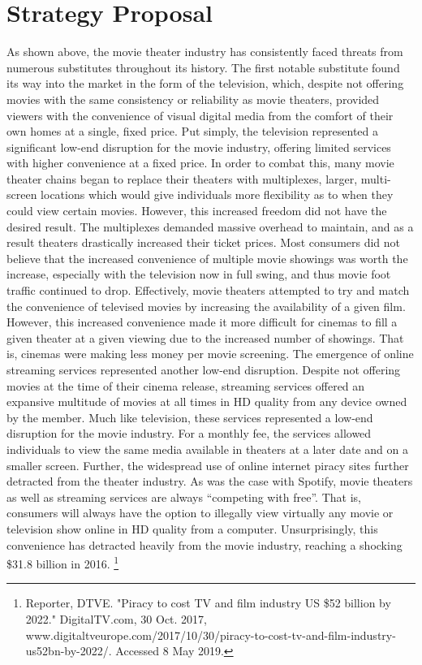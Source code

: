 \documentclass[12pt]{article}
\begin{document}
\section{Strategy Proposal}

As shown above, the movie theater industry has consistently faced threats from numerous substitutes throughout its history. The first notable substitute found its way into the market in the form of the television, which, despite not offering movies with the same consistency or reliability as movie theaters, provided viewers with the convenience of visual digital media from the comfort of their own homes at a single, fixed price. Put simply, the television represented a significant low-end disruption for the movie industry, offering limited services with higher convenience at a fixed price. In order to combat this, many movie theater chains began to replace their theaters with multiplexes, larger, multi-screen locations which would give individuals more flexibility as to when they could view certain movies. However, this increased freedom did not have the desired result. The multiplexes demanded massive overhead to maintain, and as a result theaters drastically increased their ticket prices. Most consumers did not believe that the increased convenience of multiple movie showings was worth the increase, especially with the television now in full swing, and thus movie foot traffic continued to drop. Effectively, movie theaters attempted to try and match the convenience of televised movies by increasing the availability of a given film. However, this increased convenience made it more difficult for cinemas to fill a given theater at a given viewing due to the increased number of showings. That is, cinemas were making less money per movie screening. 
The emergence of online streaming services represented another low-end disruption. Despite not offering movies at the time of their cinema release, streaming services offered an expansive multitude of movies at all times in HD quality from any device owned by the member. Much like television, these services represented a low-end disruption for the movie industry. For a monthly fee, the services allowed individuals to view the same media available in theaters at a later date and on a smaller screen. 
Further, the widespread use of online internet piracy sites further detracted from the theater industry. As was the case with Spotify, movie theaters as well as streaming services are always “competing with free”. That is, consumers will always have the option to illegally view virtually any movie or television show online in HD quality from a computer. Unsurprisingly, this convenience has detracted heavily from the movie industry, reaching a shocking \$31.8 billion in 2016. \footnote{Reporter, DTVE. "Piracy to cost TV and film industry US \$52 billion by 2022." DigitalTV.com, 30 Oct. 
     2017, www.digitaltveurope.com/2017/10/30/piracy-to-cost-tv-and-film-industry-us52bn-by-2022/. 
     Accessed 8 May 2019. }
\end{document}
